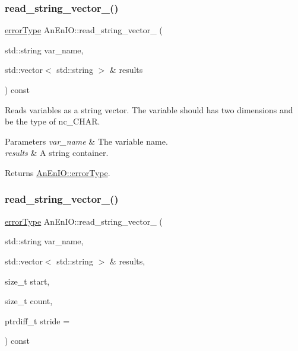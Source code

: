 \subsubsection{\texorpdfstring{read\+\_\+string\+\_\+vector\+\_\+()}{read\_string\_vector\_()}\hspace{0.1cm}{\footnotesize\ttfamily [1/2]}}
{\footnotesize\ttfamily \mbox{\hyperlink{class_an_en_i_o_aa56bc1ec6610b86db4349bce20f9ead0}{error\+Type}} An\+En\+I\+O\+::read\+\_\+string\+\_\+vector\+\_\+ (\begin{DoxyParamCaption}\item[{std\+::string}]{var\+\_\+name,  }\item[{std\+::vector$<$ std\+::string $>$ \&}]{results }\end{DoxyParamCaption}) const\hspace{0.3cm}{\ttfamily [protected]}}

Reads variables as a string vector. The variable should has two dimensions and be the type of nc\+\_\+\+C\+H\+AR.


\begin{DoxyParams}{Parameters}
{\em var\+\_\+name} & The variable name. \\
\hline
{\em results} & A string container. \\
\hline
\end{DoxyParams}
\begin{DoxyReturn}{Returns}
\mbox{\hyperlink{class_an_en_i_o_aa56bc1ec6610b86db4349bce20f9ead0}{An\+En\+I\+O\+::error\+Type}}. 
\end{DoxyReturn}
\mbox{\label{class_an_en_i_o_a8c7e28931fd88831922e64ad87ee03f2}} 
\subsubsection{\texorpdfstring{read\+\_\+string\+\_\+vector\+\_\+()}{read\_string\_vector\_()}\hspace{0.1cm}{\footnotesize\ttfamily [2/2]}}
{\footnotesize\ttfamily \mbox{\hyperlink{class_an_en_i_o_aa56bc1ec6610b86db4349bce20f9ead0}{error\+Type}} An\+En\+I\+O\+::read\+\_\+string\+\_\+vector\+\_\+ (\begin{DoxyParamCaption}\item[{std\+::string}]{var\+\_\+name,  }\item[{std\+::vector$<$ std\+::string $>$ \&}]{results,  }\item[{size\+\_\+t}]{start,  }\item[{size\+\_\+t}]{count,  }\item[{ptrdiff\+\_\+t}]{stride = {} }\end{DoxyParamCaption}) const\hspace{0.3cm}{\ttfamily [protected]}}

